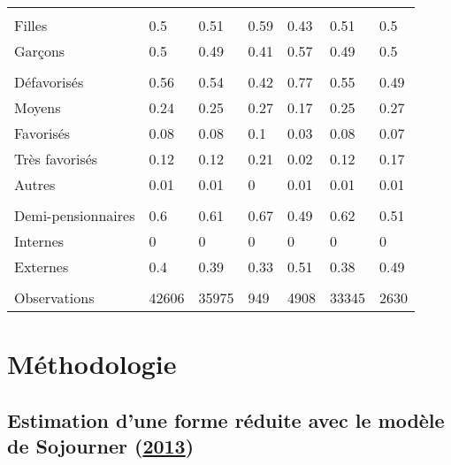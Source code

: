 \documentclass[
]{book}
\begin{document}
\begin{landscape}
\begin{ThreePartTable}
\begin{longtable}[t]{lllllll}
\addlinespace[0.3em]
\multicolumn{7}{l}{\textbf{Sexe}}\\
\hspace{1em}Filles & 0.5 & 0.51 & 0.59 & 0.43 & 0.51 & 0.5\\
\hspace{1em}Garçons & 0.5 & 0.49 & 0.41 & 0.57 & 0.49 & 0.5\\
\addlinespace[0.3em]
\multicolumn{7}{l}{\textbf{CSP}}\\
\hspace{1em}Défavorisés & 0.56 & 0.54 & 0.42 & 0.77 & 0.55 & 0.49\\
\hspace{1em}Moyens & 0.24 & 0.25 & 0.27 & 0.17 & 0.25 & 0.27\\
\hspace{1em}Favorisés & 0.08 & 0.08 & 0.1 & 0.03 & 0.08 & 0.07\\
\hspace{1em}Très favorisés & 0.12 & 0.12 & 0.21 & 0.02 & 0.12 & 0.17\\
\hspace{1em}Autres & 0.01 & 0.01 & 0 & 0.01 & 0.01 & 0.01\\
\addlinespace[0.3em]
\multicolumn{7}{l}{\textbf{Régime scolaire}}\\
\hspace{1em}Demi-pensionnaires & 0.6 & 0.61 & 0.67 & 0.49 & 0.62 & 0.51\\
\hspace{1em}Internes & 0 & 0 & 0 & 0 & 0 & 0\\
\hspace{1em}Externes & 0.4 & 0.39 & 0.33 & 0.51 & 0.38 & 0.49\\
 &  &  &  &  &  & \\
Observations & 42606 & 35975 & 949 & 4908 & 33345 & 2630\\*
\end{longtable}
\end{ThreePartTable}
\endgroup{}
\end{landscape}

\hypertarget{pemethods}{%
\section{Méthodologie}\label{pemethods}}

\hypertarget{pemethodss13}{%
\subsection{\texorpdfstring{Estimation d'une forme réduite avec le modèle de Sojourner (\protect\hyperlink{ref-SOJ:13}{2013})}{Estimation d'une forme réduite avec le modèle de Sojourner (2013)}}\label{pemethodss13}}
\end{document}
